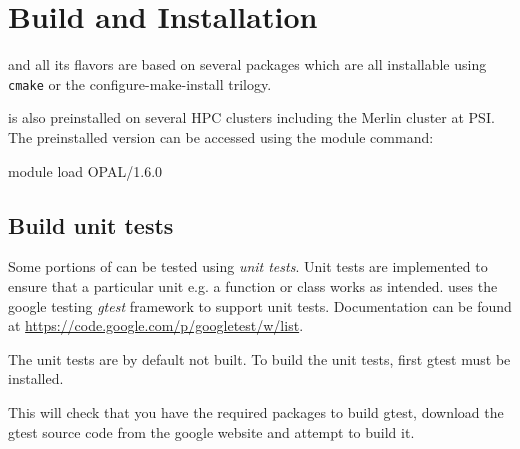 

\chapter{Build and Installation}
\label{chp:installation}
\opal and all its flavors are based on several packages which are all installable using \texttt{cmake} or the configure-make-install trilogy.

\opal is also preinstalled on several HPC clusters including the Merlin cluster at PSI. The preinstalled version can be accessed
using the module command:
\begin{footnotesize}
\begin{example}
module load OPAL/1.6.0
\end{example}
\end{footnotesize}

\section{Build unit tests} \label{chp:unittest}
Some portions of \opal can be tested using \emph{unit tests}. Unit tests are implemented to ensure that a particular unit e.g. a function or class works as intended. \opal uses the google testing \emph{gtest} framework to support unit tests. Documentation can be found at \url{https://code.google.com/p/googletest/w/list}.

The \opal unit tests are by default not built. To build the unit tests, first gtest must be installed.


This will check that you have the required packages to build gtest, download the gtest source code from the google website and attempt to build it.

